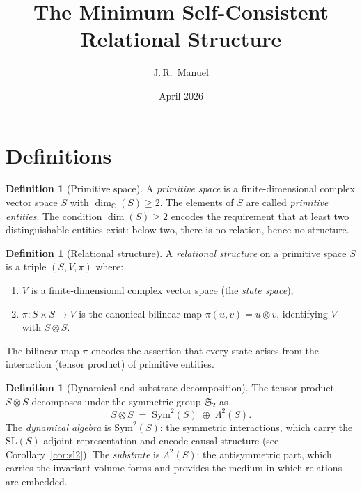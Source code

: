 \documentclass[11pt,a4paper]{article}
\title{The Minimum Self-Consistent Relational Structure}
\author{J.\,R.~Manuel}
\date{April 2026}
\theoremstyle{definition}
\newtheorem{definition}[theorem]{Definition}
\theoremstyle{remark}
\newcommand{\C}{\mathbb{C}}
\newcommand{\Sym}{\mathrm{Sym}}
\newcommand{\SL}{\mathrm{SL}}
\begin{document}
\maketitle

\section{Definitions}\label{sec:definitions}

\begin{definition}[Primitive space]\label{def:primitive}
A \emph{primitive space} is a finite-dimensional complex vector space $S$ with
$\dim_\C(S)\geq 2$.
The elements of $S$ are called \emph{primitive entities}.
The condition $\dim(S)\geq 2$ encodes the requirement that at least two
distinguishable entities exist: below two, there is no relation, hence no
structure.
\end{definition}

\begin{definition}[Relational structure]\label{def:relational}
A \emph{relational structure} on a primitive space $S$ is a triple
$(S,V,\pi)$ where:
\begin{enumerate}[nosep]
\item $V$ is a finite-dimensional complex vector space (the \emph{state space}),
\item $\pi\colon S\times S \to V$ is the canonical bilinear map
$\pi(u,v)=u\otimes v$, identifying $V$ with $S\otimes S$.
\end{enumerate}
The bilinear map $\pi$ encodes the assertion that every state arises from
the interaction (tensor product) of primitive entities.
\end{definition}

\begin{definition}[Dynamical and substrate decomposition]\label{def:decomp}
The tensor product $S\otimes S$ decomposes under the symmetric group
$\mathfrak{S}_2$ as
\[
S\otimes S \;=\; \Sym^2(S)\;\oplus\;\Lambda^2(S).
\]
The \emph{dynamical algebra} is $\Sym^2(S)$: the symmetric interactions,
which carry the $\SL(S)$-adjoint representation and encode causal
structure (see Corollary~\ref{cor:sl2}).
The \emph{substrate} is $\Lambda^2(S)$: the antisymmetric part, which
carries the invariant volume forms and provides the medium in which
relations are embedded.
\end{definition}
\end{document}
